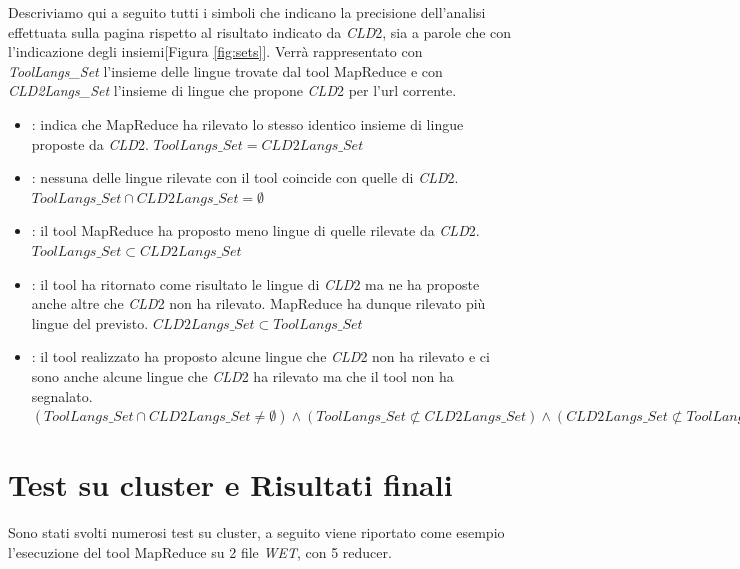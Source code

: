 \documentclass{article}
\newcommand{\MR}{MapReduce}
\newcommand{\cld}{\textit{CLD}2}
\newcommand{\WET}{\textit{WET}}
\newcommand{\imgref}[1]{[Figura \ref{#1}]}
\begin{document}
Descriviamo qui a seguito tutti i simboli che indicano la precisione dell'analisi effettuata sulla pagina rispetto al risultato indicato da \cld{}, sia a parole che con l'indicazione degli insiemi\imgref{fig:sets}. Verrà rappresentato con \textit{ToolLangs\_Set} l'insieme delle lingue trovate dal tool \MR{} e con \textit{\cld{}Langs\_Set} l'insieme di lingue che propone \cld{} per l'url corrente.
\begin{itemize}
    \item[{[1]}] \imgtick{} : indica che \MR{} ha rilevato lo stesso identico insieme di lingue proposte da \cld{}. $ToolLangs\_Set = \cld{}Langs\_Set$
    \item[{[2]}] \imgx{} : nessuna delle lingue rilevate con il tool coincide con quelle di \cld{}. $ToolLangs\_Set \cap \cld{}Langs\_Set = \emptyset$
    \item[{[3]}] \imgminus{} : il tool \MR{} ha proposto meno lingue di quelle rilevate da \cld{}. $ToolLangs\_Set \subset \cld{}Langs\_Set$
    \item[{[4]}] \imgplus{} : il tool ha ritornato come risultato le lingue di \cld{} ma ne ha proposte anche altre che \cld{} non ha rilevato. \MR{} ha dunque rilevato più lingue del previsto. $\cld{}Langs\_Set \subset ToolLangs\_Set$
    \item[{[5]}] \imgdivided{} : il tool realizzato ha proposto alcune lingue che \cld{} non ha rilevato e ci sono anche alcune lingue che \cld{} ha rilevato ma che il tool non ha segnalato. $(ToolLangs\_Set \cap \cld{}Langs\_Set \neq \emptyset) \wedge (ToolLangs\_Set  \not\subset \cld{}Langs\_Set) \wedge (\cld{}Langs\_Set \not\subset ToolLangs\_Set)$
\end{itemize}

\newpage
\section{Test su cluster e Risultati finali}

Sono stati svolti numerosi test su cluster, a seguito viene riportato come esempio l'esecuzione del tool \MR{} su 2 file \WET{}, con 5 reducer.  
\end{document}
